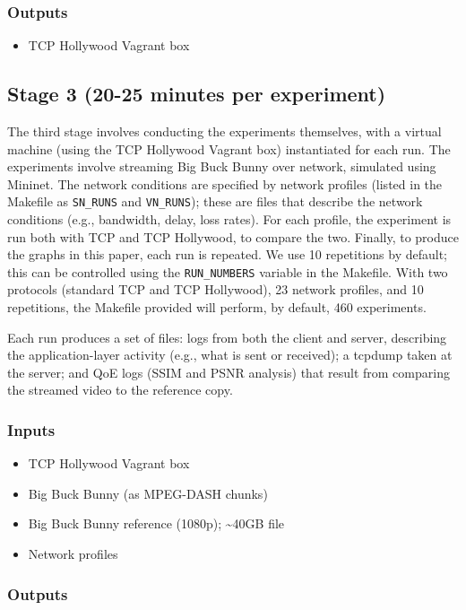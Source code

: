 \documentclass[sigconf]{acmart}
\begin{document}
\subsubsection*{Outputs}
\begin{itemize}
\item TCP Hollywood Vagrant box
\end{itemize}

\subsection*{Stage 3 (20-25 minutes per experiment)}

The third stage involves conducting the experiments themselves, with a virtual machine
(using the TCP Hollywood Vagrant box) instantiated for each run. The experiments involve
streaming Big Buck Bunny over network, simulated using Mininet. The network conditions are specified
by network profiles (listed in the Makefile as \texttt{SN\_RUNS} and \texttt{VN\_RUNS});
these are files that describe the network conditions (e.g., bandwidth, delay, loss rates).
For each profile, the experiment is run both with TCP and TCP Hollywood, to compare the
two. Finally, to produce the graphs in this paper, each run is repeated. We use 10
repetitions by default; this can be controlled using the \texttt{RUN\_NUMBERS} variable
in the Makefile. With two protocols (standard TCP and TCP Hollywood), 23 network profiles,
and 10 repetitions, the Makefile provided will perform, by default, 460 experiments.

Each run produces a set of files: logs from both the client and server, describing the
application-layer activity (e.g., what is sent or received); a tcpdump taken at the
server; and QoE logs (SSIM and PSNR analysis) that result from comparing the streamed
video to the reference copy.

\subsubsection*{Inputs}
\begin{itemize}
\item TCP Hollywood Vagrant box
\item Big Buck Bunny (as MPEG-DASH chunks)
\item Big Buck Bunny reference (1080p); \textasciitilde40GB file
\item Network profiles
\end{itemize}
\subsubsection*{Outputs}
\end{document}
